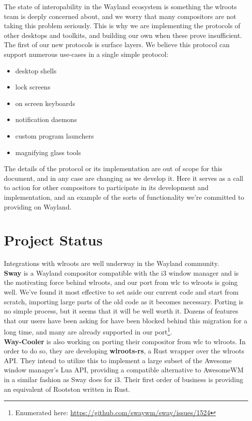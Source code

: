 \documentclass{article}
\begin{document}
The state of interopability in the Wayland ecosystem is something the wlroots
team is deeply concerned about, and we worry that many compositors are not
taking this problem seriously. This is why we are implementing the protocols of
other desktops and toolkits, and building our own when these prove insufficient.
The first of our new protocols is surface layers. We believe this protocol can
support numerous use-cases in a single simple protocol:

\begin{itemize}
    \item desktop shells
    \item lock screens
    \item on screen keyboards
    \item notification daemons
    \item custom program launchers
    \item magnifying glass tools
\end{itemize}

The details of the protocol or its implementation are out of scope for this
document, and in any case are changing as we develop it. Here it serves as a
call to action for other compositors to participate in its development and
implementation, and an example of the sorts of functionality we're committed to
providing on Wayland.

\section{Project Status}

Integrations with wlroots are well underway in the Wayland community.\\

\textbf{Sway} is a Wayland compositor compatible with the i3 window manager and
is the motivating force behind wlroots, and our port from wlc to wlroots is
going well. We've found it most effective to set aside our current code and
start from scratch, importing large parts of the old code as it becomes
necessary. Porting is no simple process, but it seems that it will be well worth
it. Dozens of features that our users have been asking for have been blocked
behind this migration for a long time, and many are already supported in our
port\footnote{Enumerated here:
\url{https://github.com/swaywm/sway/issues/1524}}.\\

\textbf{Way-Cooler} is also working on porting their compositor from wlc to
wlroots. In order to do so, they are developing \textbf{wlroots-rs}, a Rust
wrapper over the wlroots API. They intend to utilize this to implement a large
subset of the Awesome window manager's Lua API, providing a compatible
alternative to AwesomeWM in a similar fashion as Sway does for i3. Their first
order of business is providing an equivalent of Rootston written in Rust.\\
\end{document}
